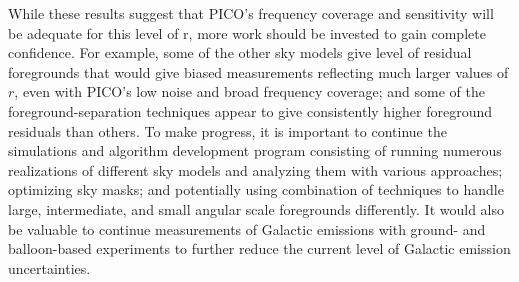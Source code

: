 \documentclass[PICOReport.tex]{subfiles}
\begin{document}
While these results suggest that PICO's frequency coverage and sensitivity will be adequate for this level of r,  more work should be invested to gain complete confidence. For example, some of the other sky models give level of residual foregrounds that would give biased measurements reflecting much larger values of $r$, even with PICO's low noise and broad frequency coverage; and some of the foreground-separation techniques appear to give consistently higher foreground residuals than others. To make progress, it is important to continue the simulations and algorithm development program consisting of  running numerous realizations of different sky models and analyzing them with various approaches; optimizing sky masks; and potentially using combination of techniques to handle large, intermediate, and small angular scale foregrounds differently. It would also be valuable to continue measurements of Galactic emissions with ground- and balloon-based experiments to further reduce the current level of Galactic emission uncertainties. 
\end{document}
